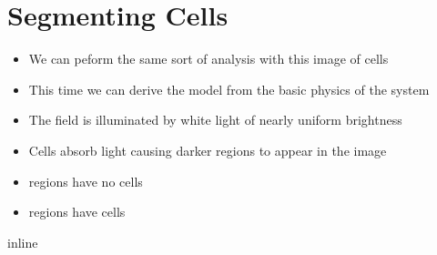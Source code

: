 \documentclass[letterpaper,10pt,english]{sphinxmanual}
\begin{document}
\chapter{Segmenting Cells}
\label{\detokenize{04-BasicSegmentation:segmenting-cells}}\begin{itemize}
\item {} 
\sphinxAtStartPar
We can peform the same sort of analysis with this image of cells

\item {} 
\sphinxAtStartPar
This time we can derive the model from the basic physics of the system

\item {} 
\sphinxAtStartPar
The field is illuminated by white light of nearly uniform brightness

\item {} 
\sphinxAtStartPar
Cells absorb light causing darker regions to appear in the image

\item {} 
\sphinxAtStartPar
{} regions have no cells

\item {} 
\sphinxAtStartPar
{} regions have cells

\end{itemize}

\begin{sphinxVerbatim}[commandchars=\\\{\}]
 inline
   
   
   
\end{sphinxVerbatim}

\begin{sphinxVerbatim}[commandchars=\\\{\}]
  

        
 
     
\end{sphinxVerbatim}
\end{document}
